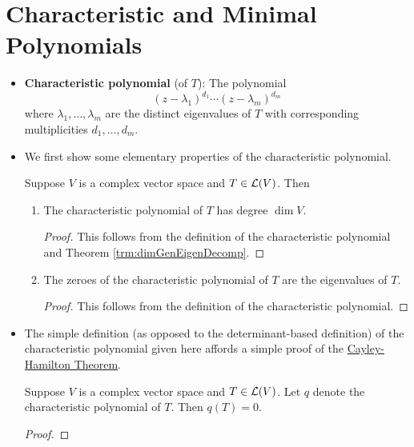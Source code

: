 \documentclass[../main.tex]{subfiles}
\begin{document}
\section{Characteristic and Minimal Polynomials}
\begin{itemize}
    \item \textbf{Characteristic polynomial} (of $T$): The polynomial
    \begin{equation*}
        (z-\lambda_1)^{d_1}\cdots(z-\lambda_m)^{d_m}
    \end{equation*}
    where $\lambda_1,\dots,\lambda_m$ are the distinct eigenvalues of $T$ with corresponding multiplicities $d_1,\dots,d_m$.
    \item We first show some elementary properties of the characteristic polynomial.
    \begin{theorem}
        Suppose $V$ is a complex vector space and $T\in\mathcal{L}(V)$. Then
        \begin{enumerate}[label={\textup{(}\alph*\textup{)}}]
            \item The characteristic polynomial of $T$ has degree $\dim V$.
            \begin{proof}
                This follows from the definition of the characteristic polynomial and Theorem \ref{trm:dimGenEigenDecomp}.
            \end{proof}
            \item The zeroes of the characteristic polynomial of $T$ are the eigenvalues of $T$.
            \begin{proof}
                This follows from the definition of the characteristic polynomial.
            \end{proof}
        \end{enumerate}
    \end{theorem}
    \item The simple definition (as opposed to the determinant-based definition) of the characteristic polynomial given here affords a simple proof of the \hyperref[trm:CayleyHamilton]{Cayley-Hamilton Theorem}.
    \begin{theorem}\label{trm:CayleyHamilton}
        Suppose $V$ is a complex vector space and $T\in\mathcal{L}(V)$. Let $q$ denote the characteristic polynomial of $T$. Then $q(T)=0$.
        \begin{proof}

\end{proof}
\end{theorem}
\end{itemize}
\end{document}
